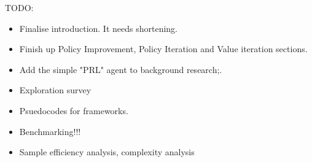 TODO:
\begin{itemize}
    \item Finalise introduction. It needs shortening.
    \item Finish up Policy Improvement, Policy Iteration and Value iteration sections.
    \item Add the simple "PRL" agent to background research;.
    \item Exploration survey
    \item Psuedocodes for frameworks.
    \item Benchmarking!!!
    \item Sample efficiency analysis, complexity analysis
\end{itemize}